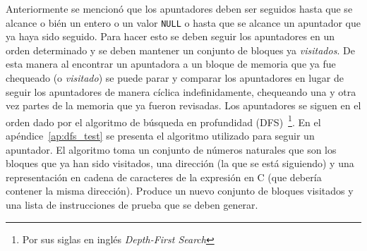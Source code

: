 \begin{comment}
\begin{figure}
\begin{lstlisting}[mathescape=true]
context fixes $\mu$ :: mem begin

partial_function (option) dfs
  :: "nat set $\Rightarrow$ addr $\Rightarrow$ string $\Rightarrow$ (nat set $\times$ test_instr list) option"
  where
  [code]: "dfs D a ca = do {
    let (base,ofs) = a;

    case $\mu$!base of
      None $\Rightarrow$ Some (D,[])
    | Some b $\Rightarrow$ do {
        let ca = adjust_addr ofs ca;
        if base $\notin$ D then do {
          let D = insert base D;
          let emit = [Discover ca base];

          fold_option ($\lambda$i (D,emit). do {
            let i=int i;
            let cval = (ofs_addr i (base_var_name base));
            case b!!i of
              None $\Rightarrow$ Some (D,emit)
            | Some (I v) $\Rightarrow$ Some (D,emit @ [Assert_Eq cval v])
            | Some (NullVal) $\Rightarrow$ Some (D,emit @ [Assert_Eq_Null cval] )
            | Some (A addr) $\Rightarrow$ do {
                (D,emit') $\leftarrow$ dfs D addr cval;
                Some (D,emit@emit')
              }
          })
            [0..<length b]
            (D,emit)

        } else do {
          Some (D,[Assert_Eq_Ptr ca base])
        }
      }
  }"
end
\end{lstlisting}

\caption{DFS para generación de pruebas}
\label{fig:dfs_test}
\end{figure}
\end{comment}

Anteriormente se mencionó que los apuntadores deben ser seguidos hasta que se alcance o bién un entero o un valor \verb|NULL| o hasta que se alcance un apuntador que ya haya sido seguido.
Para hacer esto se deben seguir los apuntadores en un orden determinado y se deben mantener un conjunto de bloques ya \textit{visitados}.
De esta manera al encontrar un apuntadora a un bloque de memoria que ya fue chequeado (o \textit{visitado}) se puede parar y comparar los apuntadores en lugar de seguir los apuntadores de manera cíclica indefinidamente, chequeando una y otra vez partes de la memoria que ya fueron revisadas.
Los apuntadores se siguen en el orden dado por el algoritmo de búsqueda en profundidad (DFS)~\footnote{Por sus siglas en inglés \textit{Depth-First Search}}.
En el apéndice~\ref{ap:dfs_test} se presenta el algoritmo utilizado para seguir un apuntador.
El algoritmo toma un conjunto de números naturales que son los bloques que ya han sido visitados, una dirección (la que se está siguiendo) y una representación en cadena de caracteres de la expresión en C (que debería contener la misma dirección).
Produce un nuevo conjunto de bloques visitados y una lista de instrucciones de prueba que se deben generar.

